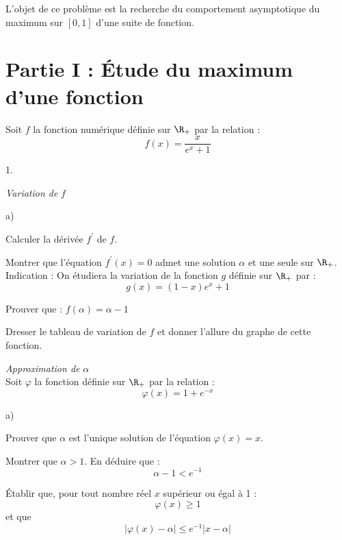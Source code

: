 \documentclass[11pt]{article}%
\begin{document}
\noindent L'objet de ce problème est la recherche du comportement
asymptotique du maximum sur $[0,1]$ d'une suite de fonction.

\section*{Partie I :\hspace{0.2cm} Étude du maximum d'une fonction}

Soit $f$ la fonction numérique définie sur $\R_{+}$ par la relation : 
\[
f(x) = \dfrac{x}{e^{x} + 1}
\]

\begin{noliste}{1.}
 \setlength{\itemsep}{4mm}
\item \textit{Variation de }$f$

\begin{noliste}{a)}
 \setlength{\itemsep}{2mm}
\item Calculer la dérivée $f^{\prime }$ de $f$.

\item Montrer que l'équation $f^{\prime }(x) = 0$ admet une solution
$\alpha $
et une seule sur $\R_{+}$.\\
Indication : On étudiera la variation de la fonction $g$ définie sur
$\R_{+}$ par : 
\[
g(x) = (1-x)e^{x} + 1
\]

\item Prouver que : $f(\alpha ) = \alpha -1$

\item Dresser le tableau de variation de $f$ et donner l'allure du
graphe de
cette fonction.
\end{noliste}

\item \textit{Approximation de }$\alpha $\\
Soit $\varphi $ la fonction définie sur $\R_{+}$ par la relation : 
\[
\varphi (x) = 1 + e^{-x}
\]

\begin{noliste}{a)}
 \setlength{\itemsep}{2mm}
\item Prouver que $\alpha $ est l'unique solution de l'équation
$\varphi
(x) = x$.

\item Montrer que $\alpha >1$. En déduire que : 
\[
\alpha -1<e^{-1}
\]

\item Établir que, pour tout nombre réel $x$ supérieur ou égal à 1 : 
\[
\varphi (x)\geq 1
\]
et que 
\[
\left| \varphi (x)-\alpha \right| \leq e^{-1}\left|
x-\alpha \right|
\]


\end{noliste}
\end{noliste}
\end{document}

